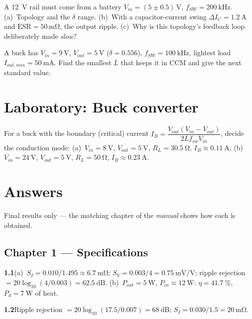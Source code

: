 \documentclass[11pt,a4paper,oneside]{book}
\newcommand{\ans}[1]{\par\smallskip\noindent\textbf{#1}\quad\ignorespaces}
\begin{document}
\begin{exercise}
A \qty{12}{\volt} rail must come from a battery $V_{in}=(5\pm0.5)\,\unit{\volt}$,
$f_{SW}=\qty{200}{\kilo\hertz}$.
(a)~Topology and the $\delta$ range.
(b)~With a capacitor-current swing $\Delta I_C=\qty{1.2}{\ampere}$ and
$\text{ESR}=\qty{50}{\milli\ohm}$, the output ripple.
(c)~Why is this topology's feedback loop deliberately made \emph{slow}?
\end{exercise}

\begin{exercise}
A buck has $V_{in}=\qty{9}{\volt}$, $V_{out}=\qty{5}{\volt}$ ($\delta=0.556$),
$f_{SW}=\qty{100}{\kilo\hertz}$, lightest load $I_{out,min}=\qty{50}{\milli\ampere}$.
Find the smallest $L$ that keeps it in CCM and give the next standard value.
\end{exercise}

\chapter{Laboratory: Buck converter}

\begin{exercise}
For a buck with the boundary (critical) current
$I_B=\dfrac{V_{out}(V_{in}-V_{out})}{2Lf_{sw}V_{in}}$, decide the conduction mode:
(a)~$V_{in}=\qty{8}{\volt}$, $V_{out}=\qty{5}{\volt}$, $R_L=\qty{30.5}{\ohm}$,
$I_B\approx\qty{0.11}{\ampere}$;
(b)~$V_{in}=\qty{24}{\volt}$, $V_{out}=\qty{5}{\volt}$, $R_L=\qty{50}{\ohm}$,
$I_B\approx\qty{0.23}{\ampere}$.
\end{exercise}

\chapter{Answers}\label{ch:answers}

Final results only --- the matching chapter of the \emph{manual} shows how each is
obtained.

\section*{Chapter 1 --- Specifications}
\ans{1.1}(a)~$S_I=0.010/1.495\approx\qty{6.7}{\milli\ohm}$;
$S_V=0.003/4=\qty{0.75}{\milli\volt\per\volt}$; ripple rejection
$=20\log_{10}(4/0.003)=\qty{62.5}{\dB}$.
(b)~$P_{out}=\qty{5}{\watt}$, $P_{in}\approx\qty{12}{\watt}$:
$\eta=\qty{41.7}{\percent}$, $P_d=\qty{7}{\watt}$ of heat.
\ans{1.2}Ripple rejection $=20\log_{10}(17.5/0.007)=\qty{68}{\dB}$;
$S_I=0.030/1.5=\qty{20}{\milli\ohm}$.
\end{document}
